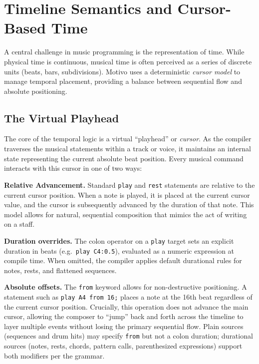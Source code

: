 \section{Timeline Semantics and Cursor-Based Time}\label{sec:temporal-model}

A central challenge in music programming is the representation of time.
While physical time is continuous, musical time is often perceived as a series of discrete units (beats, bars,
subdivisions).
Motivo uses a deterministic \textit{cursor model} to manage temporal placement, providing a balance
between sequential flow and absolute positioning.

\subsection{The Virtual Playhead}\label{detail-subsec:the-virtual-playhead}

The core of the temporal logic is a virtual ``playhead'' or \textit{cursor}.
As the compiler traverses the musical statements within a track or voice, it maintains an internal state representing
the current absolute beat position.
Every musical command interacts with this cursor in one of two ways:

\noindent \textbf{Relative Advancement.} Standard \texttt{play} and \texttt{rest} statements are relative to the current
cursor position.
When a note is played, it is placed at the current cursor value, and the cursor is subsequently advanced by the
duration of that note.
This model allows for natural, sequential composition that mimics the act of writing on a staff.

\noindent \textbf{Duration overrides.} The colon operator on a \texttt{play} target sets an explicit duration in beats
(e.g.\ \texttt{play C4:0.5}), evaluated as a numeric expression at compile time.
When omitted, the compiler applies default durational rules for notes, rests, and flattened sequences.

\noindent \textbf{Absolute offsets.} The \texttt{from} keyword allows for non-destructive positioning.
A statement such as \texttt{play A4 from 16;} places a note at the 16th beat regardless of the current cursor
position.
Crucially, this operation does not advance the main cursor, allowing the composer to ``jump'' back and forth across
the timeline to layer multiple events without losing the primary sequential flow.
Plain sources (sequences and drum hits) may specify \texttt{from} but not a colon duration; durational sources
(notes, rests, chords, pattern calls, parenthesized expressions) support both modifiers per the grammar.

